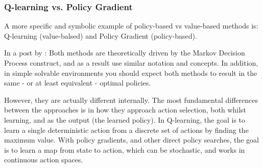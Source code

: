 \documentclass[lang=en,mode=normal,device=normal,color=blue,12pt]{elegantnote}
\DeclareMathOperator*{\1}{\mathbbm{1}}
\begin{document}
\begin{appendices}
\subsubsection{Q-learning vs. Policy Gradient}

A more specific and symbolic example of policy-based vs value-based methods is: Q-learning (value-balsed) and Policy Gradient (policy-based).

In a post by \cite{qlearningvspg}: Both methods are theoretically driven by the Markov Decision Process construct, and as a result use similar notation and concepts. In addition, in simple solvable environments you should expect both methods to result in the same - or at least equivalent - optimal policies.

However, they are actually different internally. The most fundamental differences between the approaches is in how they approach action selection, both whilst learning, and as the output (the learned policy). In Q-learning, the goal is to learn a single deterministic action from a discrete set of actions by finding the maximum value. With policy gradients, and other direct policy searches, the goal is to learn a map from state to action, which can be stochastic, and works in continuous action spaces.


\end{appendices}
\end{document}
